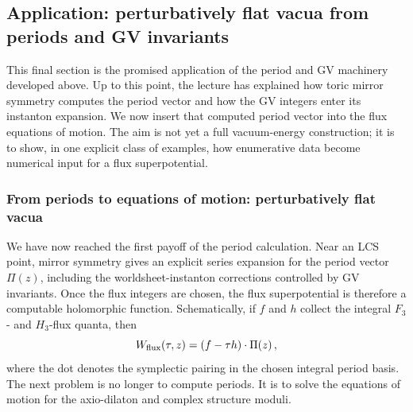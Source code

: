 \subsection{Application: perturbatively flat vacua from periods and GV invariants}\label{ssec:L2-PFV-application}


This final section is the promised application of the period and
GV machinery developed above.  Up to this point, the lecture has explained
how toric mirror symmetry computes the period vector and how the GV
integers enter its instanton expansion.  We now insert that computed
period vector into the flux equations of motion.  The aim is not yet a
full vacuum-energy construction; it is to show, in one explicit class of
examples, how enumerative data become numerical input for a flux
superpotential.

\subsubsection{From periods to equations of motion: perturbatively flat vacua}\label{ssec:L2-smallW0}

We have now reached the first payoff of the period
calculation.  Near an LCS point, mirror symmetry gives an explicit
series expansion for the period vector $\Pi(z)$, including the
worldsheet-instanton corrections controlled by GV invariants.  Once
the flux integers are chosen, the flux superpotential is therefore a
computable holomorphic function.  Schematically, if $f$ and $h$
collect the integral $F_3$- and $H_3$-flux quanta, then
\begin{equation}
    W_{\rm flux}(\tau,z)
      =
      (f-\tau h)\cdot \Pi(z)\, ,
\end{equation}
where the dot denotes the symplectic pairing in the chosen integral
period basis.  The next problem is no longer to compute periods.  It
is to solve the equations of motion for the axio-dilaton and complex
structure moduli.

